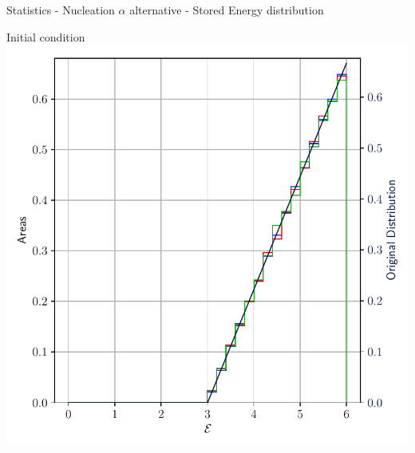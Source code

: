 \documentclass[usenames,dvipsnames]{beamer}
\begin{document}

\begin{frame}{Statistics - Nucleation $\alpha$ alternative - Stored Energy distribution}
\small
    \begin{minipage}{0.5\textwidth}
    \centering
    \scriptsize
    Initial condition
    \includegraphics[trim={0 1em 0 1.1em},clip=true,scale=0.35]{figures/stored_energy/SE/se/000000_nuclalternative_set.pdf}
    \end{minipage}%
    \begin{minipage}{0.5\textwidth}
    \centering

\end{minipage}
\end{frame}
\end{document}
